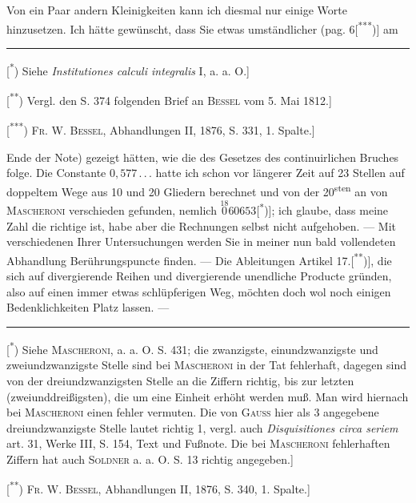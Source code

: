 \indent Von ein Paar andern Kleinigkeiten kann ich diesmal nur einige Worte hinzusetzen. Ich hätte gewünscht, dass Sie etwas umständlicher (pag. 6[\textsuperscript{***})] am
\par\medskip\noindent\rule{.24\linewidth}{.4pt}\par\smallskip
{\small
\noindent\hspace*{\parindent}[\textsuperscript{*}) Siehe \textit{Institutiones calculi integralis} I, a. a. O.]
\par\noindent\hspace*{\parindent}[\textsuperscript{**}) Vergl. den S. 374 folgenden Brief an \textsc{Bessel} vom 5. Mai 1812.]
\par\noindent\hspace*{\parindent}[\textsuperscript{***}) \textsc{Fr. W. Bessel}, Abhandlungen II, 1876, S. 331, 1. Spalte.]
\par}
\clearpage{}
\noindent Ende der Note) gezeigt hätten, wie die  des Gesetzes des continuirlichen Bruches  folge. Die Constante $0{,}577\,{.}\,{.}\,{.}$ hatte ich schon vor längerer Zeit auf 23 Stellen auf doppeltem Wege aus 10 und 20 Gliedern berechnet und von der 20\textsuperscript{sten} an von \textsc{Mascheroni} verschieden gefunden, nemlich $\overset{\scriptscriptstyle18}{0}60653$[\textsuperscript{*})]; ich glaube, dass meine Zahl die richtige ist, habe aber die Rechnungen selbst nicht aufgehoben. — Mit verschiedenen Ihrer Untersuchungen werden Sie in meiner nun bald vollendeten Abhandlung Berührungspuncte finden. — Die Ableitungen Artikel 17.[\textsuperscript{**})], die sich auf divergierende Reihen und divergierende unendliche Producte gründen, also auf einen immer etwas schlüpferigen Weg, möchten doch wol noch einigen Bedenklichkeiten Platz lassen. —
\par\medskip\noindent\rule{.24\linewidth}{.4pt}\par\smallskip
{\small
\noindent\hspace*{\parindent}[\textsuperscript{*}) Siehe \textsc{Mascheroni}, a. a. O. S. 431; die zwanzigste, einundzwanzigste und zweiundzwanzigste Stelle sind bei \textsc{Mascheroni} in der Tat fehlerhaft, dagegen sind von der dreiundzwanzigsten Stelle an die Ziffern richtig, bis zur letzten (zweiunddreißigsten), die um eine Einheit erhöht werden muß. Man wird hiernach bei \textsc{Mascheroni} einen fehler vermuten. Die von \textsc{Gauss} hier als 3 angegebene dreiundzwanzigste Stelle lautet richtig 1, vergl. auch \textit{Disquisitiones circa seriem} art. 31, Werke III, S. 154, Text und Fußnote. Die bei \textsc{Mascheroni} fehlerhaften Ziffern hat auch \textsc{Soldner} a. a. O. S. 13 richtig angegeben.]
\par\noindent\hspace*{\parindent}[\textsuperscript{**}) \textsc{Fr. W. Bessel}, Abhandlungen II, 1876, S. 340, 1. Spalte.]
\par}
